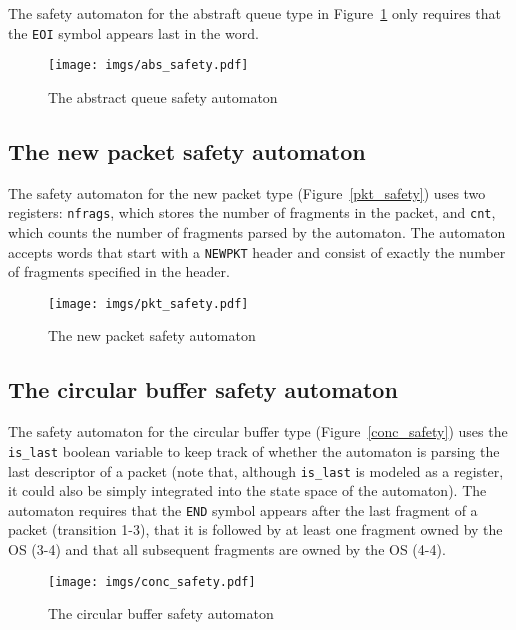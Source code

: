 \documentclass{article}
\begin{document}
The safety automaton for the abstraft queue type in 
Figure~\ref{f:abs_safety} only requires that the \texttt{EOI} 
symbol appears last in the word.

\begin{figure}[t]
    \center
    \texttt{[image: imgs/abs\_safety.pdf]}
    \caption{The abstract queue safety automaton}\label{f:abs_safety}
\end{figure}


\subsection{The new packet safety automaton}

The safety automaton for the new packet type 
(Figure~\ref{pkt_safety}) uses two registers: \texttt{nfrags}, 
which stores the number of fragments in the packet, and 
\texttt{cnt}, which counts the number of fragments parsed by the 
automaton.  The automaton accepts words that start with a 
\texttt{NEWPKT} header and consist of exactly the number of 
fragments specified in the header. 

\begin{figure}[t]
    \center
    \texttt{[image: imgs/pkt\_safety.pdf]}
    \caption{The new packet safety automaton}\label{f:pkt_safety}
\end{figure}




\subsection{The circular buffer safety 
automaton}\label{s:conc_safety}

The safety automaton for the circular buffer type 
(Figure~\ref{conc_safety}) uses the \texttt{is\_last} boolean 
variable to keep track of whether the automaton is parsing the 
last descriptor of a packet (note that, although \texttt{is\_last} 
is modeled as a register, it could also be simply integrated into 
the state space of the automaton).  The automaton requires that 
the \texttt{END} symbol appears after the last fragment of a 
packet (transition 1-3), that it is followed by at least one 
fragment owned by the OS (3-4) and that all subsequent fragments 
are owned by the OS (4-4).  

\begin{figure}[t]
    \center
    \texttt{[image: imgs/conc\_safety.pdf]}
    \caption{The circular buffer safety 
    automaton}\label{f:conc_safety}
\end{figure}
\end{document}
